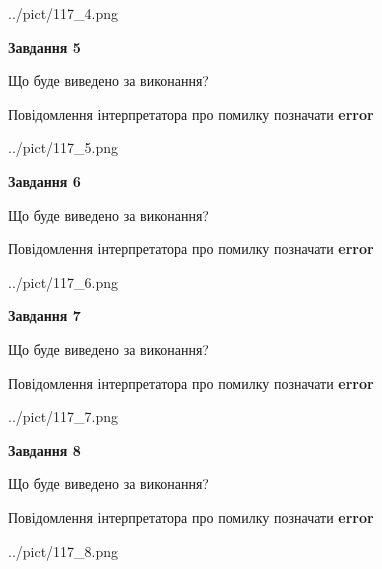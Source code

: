 \documentclass[12pt, ukrainian]{article}
\begin{document}
{\begin{center}
	{../pict/117_4.png}
\end{center}
\newpage

{\begin {center}\textbf{Завдання 5}\end {center}}\par
Що буде виведено за виконання? \par
Повідомлення інтерпретатора про помилку позначати \textbf{error}

\begin{center}
	{../pict/117_5.png}
\end{center}
\newpage

{\begin {center}\textbf{Завдання 6}\end {center}}\par
Що буде виведено за виконання? \par
Повідомлення інтерпретатора про помилку позначати \textbf{error}

\begin{center}
	{../pict/117_6.png}
\end{center}
\newpage

{\begin {center}\textbf{Завдання 7}\end {center}}\par
Що буде виведено за виконання? \par
Повідомлення інтерпретатора про помилку позначати \textbf{error}

\begin{center}
	{../pict/117_7.png}
\end{center}
\newpage

{\begin {center}\textbf{Завдання 8}\end {center}}\par
Що буде виведено за виконання? \par
Повідомлення інтерпретатора про помилку позначати \textbf{error}

\begin{center}
	{../pict/117_8.png}
\end{center}
\newpage

}
\end{document}
